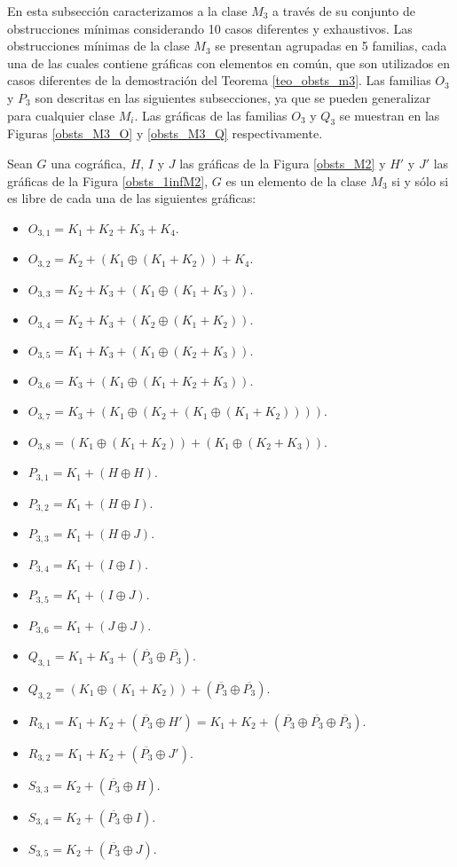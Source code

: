 En esta subsección caracterizamos a la clase $M_3$ a través de su conjunto de obstrucciones mínimas considerando 10 casos diferentes y exhaustivos. Las obstrucciones mínimas de la clase $M_3$ se presentan agrupadas en 5 familias, cada una de las cuales contiene gráficas con elementos en común, que son utilizados en casos diferentes de la demostración del Teorema \ref{teo_obsts_m3}. Las familias $O_3$ y $P_3$ son descritas en las siguientes subsecciones, ya que se pueden generalizar para cualquier clase $M_i$. Las gráficas de las familias $O_3$ y $Q_3$ se muestran en las Figuras \ref{obsts_M3_O} y \ref{obsts_M3_Q} respectivamente.


\begin{theorem} \label{teo_obsts_m3}

    Sean $G$ una cográfica, $H$, $I$ y $J$ las gráficas de la Figura \ref{obsts_M2} y $H'$ y $J'$ las gráficas de la Figura \ref{obsts_1infM2}, $G$ es un elemento de la clase $M_3$ si y sólo si es libre de cada una de las siguientes gráficas:
    \begin{itemize}
        \item $O_{3,1}=K_1+K_2+K_3+K_4$.
        \item $O_{3,2}=K_2+(K_1\oplus(K_1+K_2))+K_4$.
        \item $O_{3,3}=K_2+K_3+(K_1\oplus(K_1+K_3))$.
        \item $O_{3,4}=K_2+K_3+(K_2\oplus(K_1+K_2))$.
        \item $O_{3,5}=K_1+K_3+(K_1\oplus(K_2+K_3))$.
        \item $O_{3,6}=K_3+(K_1\oplus(K_1+K_2+K_3))$.
        \item $O_{3,7}=K_3+(K_1\oplus(K_2+(K_1\oplus(K_1+K_2))))$.
        \item $O_{3,8}=(K_1\oplus(K_1+K_2))+(K_1\oplus(K_2+K_3))$.
        \item $P_{3,1}=K_1+(H\oplus H)$.
        \item $P_{3,2}=K_1+(H\oplus I)$.
        \item $P_{3,3}=K_1+(H\oplus J)$.
        \item $P_{3,4}=K_1+(I\oplus I)$.
        \item $P_{3,5}=K_1+(I\oplus J)$.
        \item $P_{3,6}=K_1+(J\oplus J)$.
        \item $Q_{3,1}=K_1+K_3+(\overline{P_3}\oplus\overline{P_3})$.
        \item $Q_{3,2}=(K_1\oplus(K_1+K_2))+(\overline{P_3}\oplus\overline{P_3})$.
        \item $R_{3,1}=K_1+K_2+(\overline{P_3}\oplus H') = K_1+K_2+(\overline{P_3}\oplus\overline{P_3}\oplus\overline{P_3})$.
        \item $R_{3,2}=K_1+K_2+(\overline{P_3}\oplus J')$.
        \item $S_{3,3}=K_2+(\overline{P_3}\oplus H)$.
        \item $S_{3,4}=K_2+(\overline{P_3}\oplus I)$.
        \item $S_{3,5}=K_2+(\overline{P_3}\oplus J)$.
    \end{itemize}

\end{theorem}


